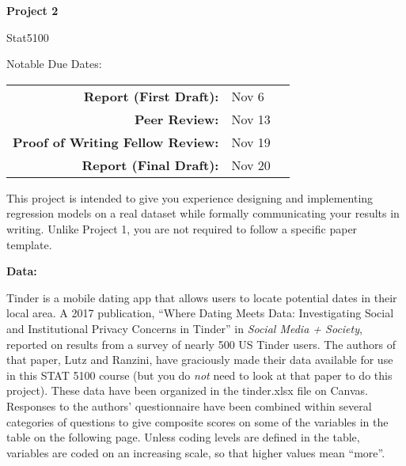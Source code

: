 \documentclass[12pt]{report}
\begin{document}
\Large
\begin{center}
   \textbf{Project 2}
   
\vspace{0.5cm}
   
 Stat5100
  
\end{center}
\normalsize

\vspace{1em}

Notable Due Dates:

\vspace{1em}
\begin{tabular}{r l l}
{\bf Report (First Draft):} & Nov 6 \\
{\bf Peer Review:} & Nov 13 \\
{\bf Proof of Writing Fellow Review:} & Nov 19 \\
{\bf Report (Final Draft):} & Nov 20 \\
\end{tabular}

\vspace{1em}

This project is intended to give you experience designing and implementing regression models on a real dataset while formally communicating your results in writing. Unlike Project 1, you are not required to follow a specific paper template.

\vspace{1em}

\large{\bf Data:}\\
\normalsize

Tinder is a mobile dating app that allows users to locate potential dates in their local area.
A 2017 publication, ``Where Dating Meets Data: Investigating
 Social and Institutional Privacy Concerns in Tinder'' in {\it Social Media + Society}, reported on results from a survey of
 nearly 500 US Tinder users.  The authors of that paper, Lutz and Ranzini, have graciously made their data available
for use in this STAT 5100 course (but you do {\it not} need to look at that paper to do this project).
These data have been organized in the tinder.xlsx file on Canvas.\\

Responses to the authors' questionnaire have been combined within several categories of questions
to give composite scores on some of the variables in the table on the following page.
Unless coding levels are defined in the table, variables
are coded on an increasing scale, so that higher values mean ``more''.\\
\end{document}
